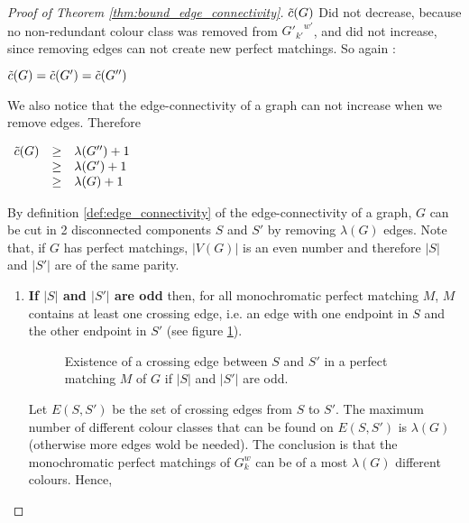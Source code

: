 \begin{proof}[Proof of Theorem \ref{thm:bound_edge_connectivity}]
    $\Tilde{c}(G)$ Did not decrease, because no non-redundant colour class was removed from ${G'_{k'}}^{w'}$, and did not increase, since removing edges can not create new perfect matchings. So again :
    
    \begin{center}
        $\Tilde{c}(G) = \Tilde{c}(G') = \Tilde{c}(G'')$
    \end{center}
    
    We also notice that the edge-connectivity of a graph can not increase when we remove edges. Therefore
    
    \begin{center}
        $\begin{array}{l c l}
            \Tilde{c}(G) & \geq & \lambda(G'') + 1 \\
                         & \geq & \lambda(G') + 1 \\
                         & \geq & \lambda(G) + 1
        \end{array}$
    \end{center}
    
    By definition \ref{def:edge_connectivity} of the edge-connectivity of a graph, $G$ can be cut in 2 disconnected components $S$ and $S'$ by removing $\lambda(G)$ edges. Note that, if $G$ has perfect matchings, $|V(G)|$ is an even number and therefore $|S|$ and $|S'|$ are of the same parity.
    
    \begin{enumerate}
        \item 
            \textbf{If $|S|$ and $|S'|$ are odd} then, for all monochromatic perfect matching $M$, $M$ contains at least one crossing edge, i.e. an edge with one endpoint in $S$ and the other endpoint in $S'$ (see figure \ref{fig:proof_lambda_odd}).
            
            \begin{figure}[H]
                \caption{Existence of a crossing edge between $S$ and $S'$ in a perfect matching $M$ of $G$ if $|S|$ and $|S'|$ are odd.}
                \label{fig:proof_lambda_odd}
            \end{figure}
            
            Let $E(S, S')$ be the set of crossing edges from $S$ to $S'$. The maximum number of different colour classes that can be found on $E(S, S')$ is $\lambda(G)$ (otherwise more edges wold be needed). The conclusion is that the monochromatic perfect matchings of $G_k^w$ can be of a most $\lambda(G)$ different colours. Hence,
            

\end{enumerate}
\end{proof}
